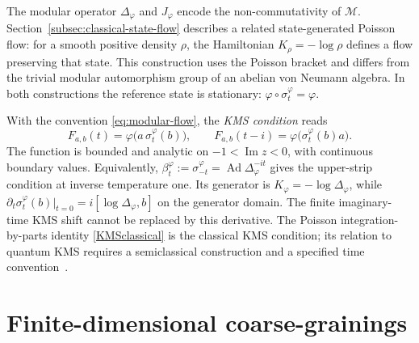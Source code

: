 \documentclass[a4paper,11pt]{article}
\theoremstyle{definition}
\begin{document}
The modular operator $\Delta_\varphi$ and $J_\varphi$ encode the non-commutativity of
$\mathcal M$. Section~\ref{subsec:classical-state-flow} describes a related
state-generated Poisson flow: for a smooth positive density $\rho$, the Hamiltonian
$K_\rho=-\log\rho$ defines a flow preserving that state. This construction uses
the Poisson bracket and differs from the trivial modular automorphism group of
an abelian von Neumann algebra. In both constructions the reference state is stationary:
$\varphi\circ\sigma_t^\varphi=\varphi$.

With the convention \eqref{eq:modular-flow}, the \emph{KMS condition} reads
\begin{equation}
 F_{a,b}(t)=\varphi\bigl(a\,\sigma_t^\varphi(b)\bigr),
 \qquad F_{a,b}(t-i)=\varphi\bigl(\sigma_t^\varphi(b)a\bigr).
 \label{eq:KMS-function}
\end{equation}
The function is bounded and analytic on $-1<\operatorname{Im}z<0$, with continuous
boundary values. Equivalently, $\beta_t^\varphi:=\sigma_{-t}^\varphi
=\operatorname{Ad}\Delta_\varphi^{-it}$ gives the upper-strip condition at inverse
temperature one. Its generator is $K_\varphi=-\log\Delta_\varphi$, while
$\partial_t\sigma_t^\varphi(b)|_{t=0}=i[\log\Delta_\varphi,b]$ on the generator domain.
The finite imaginary-time KMS shift cannot be replaced by this derivative.
The Poisson integration-by-parts identity \eqref{KMSclassical} is the classical
KMS condition; its relation to quantum KMS requires a semiclassical construction
and a specified time convention~\cite{vanDeVen2022}.


\section{Finite-dimensional coarse-grainings}\label{app:finite-coarse}
\end{document}
